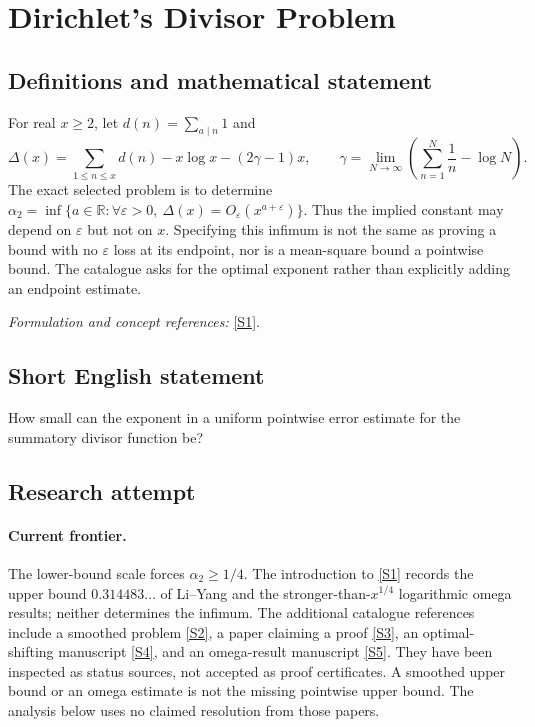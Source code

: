 \documentclass[11pt,a4paper]{article}
\newcommand{\R}{\mathbb{R}}
\newcommand{\eps}{\varepsilon}
\newcommand{\sref}[2]{\hyperlink{source:#1:#2}{[S#2]}}
\newif\ifshowcatalogue
\newcommand{\cataloguescope}[1]{\ifshowcatalogue
 \paragraph{Exact scope in the supplied catalogue.}
 \begin{quote}\small #1\end{quote}\fi}
\numberwithin{equation}{section}
\begin{document}
\setcounter{section}{0}
\clearpage
\section*{\texorpdfstring{Dirichlet's Divisor Problem}{Dirichlet's Divisor Problem}}\label{statement}
\subsection{Definitions and mathematical statement}
For real $x\ge2$, let $d(n)=\sum_{a\mid n}1$ and
\[
 \Delta(x)=\sum_{1\le n\le x}d(n)-x\log x-(2\gamma-1)x,
 \qquad \gamma=\lim_{N\to\infty}\left(\sum_{n=1}^N\frac1n-\log N\right).
\]
The exact selected problem is to determine
$\alpha_2=\inf\{a\in\R:\forall\eps>0,\ \Delta(x)=O_\eps(x^{a+\eps})\}$.
Thus the implied constant may depend on $\eps$ but not on $x$. Specifying this infimum is not the same as proving a bound with no $\eps$ loss at its endpoint, nor is a mean-square bound a pointwise bound. The catalogue asks for the optimal exponent rather than explicitly adding an endpoint estimate.
\par\smallskip\textit{Formulation and concept references:} \sref{statement}{1}.
\cataloguescope{Let d(n) count the positive divisors of n and Delta(x)=sum\_\{n<=x\} d(n)-x log x-(2 gamma-1)x for real x>=2. Determine the optimal exponent alpha\_2=inf\{a: for every epsilon>0, Delta(x)=O\_epsilon(x\textasciicircum{}(a+epsilon)) as x tends to infinity\}.}
\subsection{Short English statement}
How small can the exponent in a uniform pointwise error estimate for the summatory divisor function be?
\subsection{Research attempt}

\paragraph{Current frontier.}
The lower-bound scale forces $\alpha_2\ge1/4$. The introduction to
\sref{statement}{1} records the upper bound $0.314483\ldots$ of Li--Yang and the
stronger-than-$x^{1/4}$ logarithmic omega results; neither determines the
infimum. The additional catalogue references include a smoothed problem
\sref{statement}{2}, a paper claiming a proof \sref{statement}{3}, an optimal-shifting
manuscript \sref{statement}{4}, and an omega-result manuscript \sref{statement}{5}.
They have been inspected as status sources, not accepted as proof
certificates. A smoothed upper bound or an omega estimate is not the missing
pointwise upper bound. The analysis below uses no claimed resolution from
those papers.
\end{document}
